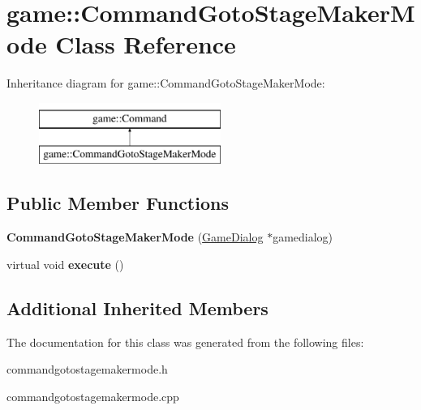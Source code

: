 \hypertarget{classgame_1_1CommandGotoStageMakerMode}{}\section{game\+:\+:Command\+Goto\+Stage\+Maker\+Mode Class Reference}
\label{classgame_1_1CommandGotoStageMakerMode}
Inheritance diagram for game\+:\+:Command\+Goto\+Stage\+Maker\+Mode\+:\begin{figure}[H]
\begin{center}
\leavevmode
\includegraphics[height=2.000000cm]{classgame_1_1CommandGotoStageMakerMode}
\end{center}
\end{figure}
\subsection*{Public Member Functions}
\begin{DoxyCompactItemize}
\item 
\mbox{\label{classgame_1_1CommandGotoStageMakerMode_ac25c4399221f8eea3ab61f1172190137}} 
{\bfseries Command\+Goto\+Stage\+Maker\+Mode} (\hyperlink{classgame_1_1GameDialog}{Game\+Dialog} $\ast$gamedialog)
\item 
\mbox{\label{classgame_1_1CommandGotoStageMakerMode_a1f4a37f00c73f76cfb50650e0aefcbf8}} 
virtual void {\bfseries execute} ()
\end{DoxyCompactItemize}
\subsection*{Additional Inherited Members}


The documentation for this class was generated from the following files\+:\begin{DoxyCompactItemize}
\item 
commandgotostagemakermode.\+h\item 
commandgotostagemakermode.\+cpp\end{DoxyCompactItemize}
